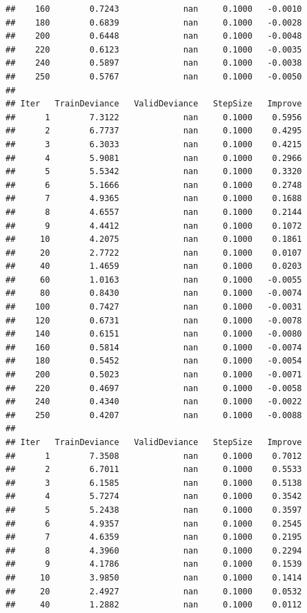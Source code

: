 \documentclass[
]{book}
\begin{document}
\begin{verbatim}
##    160        0.7243             nan     0.1000   -0.0010
##    180        0.6839             nan     0.1000   -0.0028
##    200        0.6448             nan     0.1000   -0.0048
##    220        0.6123             nan     0.1000   -0.0035
##    240        0.5897             nan     0.1000   -0.0038
##    250        0.5767             nan     0.1000   -0.0050
## 
## Iter   TrainDeviance   ValidDeviance   StepSize   Improve
##      1        7.3122             nan     0.1000    0.5956
##      2        6.7737             nan     0.1000    0.4295
##      3        6.3033             nan     0.1000    0.4215
##      4        5.9081             nan     0.1000    0.2966
##      5        5.5342             nan     0.1000    0.3320
##      6        5.1666             nan     0.1000    0.2748
##      7        4.9365             nan     0.1000    0.1688
##      8        4.6557             nan     0.1000    0.2144
##      9        4.4412             nan     0.1000    0.1072
##     10        4.2075             nan     0.1000    0.1861
##     20        2.7722             nan     0.1000    0.0107
##     40        1.4659             nan     0.1000    0.0203
##     60        1.0163             nan     0.1000   -0.0055
##     80        0.8430             nan     0.1000   -0.0074
##    100        0.7427             nan     0.1000   -0.0031
##    120        0.6731             nan     0.1000   -0.0078
##    140        0.6151             nan     0.1000   -0.0080
##    160        0.5814             nan     0.1000   -0.0074
##    180        0.5452             nan     0.1000   -0.0054
##    200        0.5023             nan     0.1000   -0.0071
##    220        0.4697             nan     0.1000   -0.0058
##    240        0.4340             nan     0.1000   -0.0022
##    250        0.4207             nan     0.1000   -0.0088
## 
## Iter   TrainDeviance   ValidDeviance   StepSize   Improve
##      1        7.3508             nan     0.1000    0.7012
##      2        6.7011             nan     0.1000    0.5533
##      3        6.1585             nan     0.1000    0.5138
##      4        5.7274             nan     0.1000    0.3542
##      5        5.2438             nan     0.1000    0.3597
##      6        4.9357             nan     0.1000    0.2545
##      7        4.6359             nan     0.1000    0.2195
##      8        4.3960             nan     0.1000    0.2294
##      9        4.1786             nan     0.1000    0.1539
##     10        3.9850             nan     0.1000    0.1414
##     20        2.4927             nan     0.1000    0.0532
##     40        1.2882             nan     0.1000    0.0112

\end{verbatim}
\end{document}
